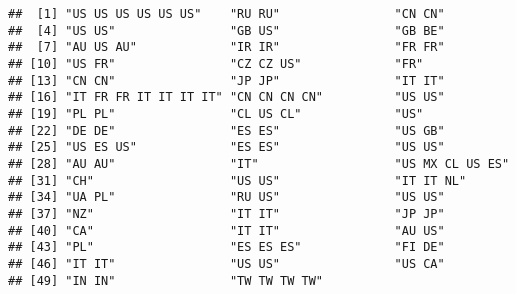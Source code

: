 \documentclass[
]{article}
\begin{document}
\begin{verbatim}
##  [1] "US US US US US US"    "RU RU"                "CN CN"               
##  [4] "US US"                "GB US"                "GB BE"               
##  [7] "AU US AU"             "IR IR"                "FR FR"               
## [10] "US FR"                "CZ CZ US"             "FR"                  
## [13] "CN CN"                "JP JP"                "IT IT"               
## [16] "IT FR FR IT IT IT IT" "CN CN CN CN"          "US US"               
## [19] "PL PL"                "CL US CL"             "US"                  
## [22] "DE DE"                "ES ES"                "US GB"               
## [25] "US ES US"             "ES ES"                "US US"               
## [28] "AU AU"                "IT"                   "US MX CL US ES"      
## [31] "CH"                   "US US"                "IT IT NL"            
## [34] "UA PL"                "RU US"                "US US"               
## [37] "NZ"                   "IT IT"                "JP JP"               
## [40] "CA"                   "IT IT"                "AU US"               
## [43] "PL"                   "ES ES ES"             "FI DE"               
## [46] "IT IT"                "US US"                "US CA"               
## [49] "IN IN"                "TW TW TW TW"
\end{verbatim}
\end{document}
